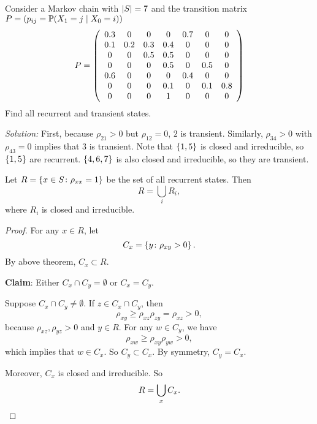 \begin{exam}
    Consider a Markov chain with $\left\lvert S\right\lvert = 7$ and the transition matrix $P= (p_{ij} = \mathbb{P}(X_1 = j \mid X_0 = i))$
    \begin{equation*}
        P = \left(
            \begin{array}{ccccccc}
                0.3 & 0 & 0 & 0 & 0.7 & 0 & 0 \\
                0.1 & 0.2 & 0.3 & 0.4 & 0 & 0 & 0 \\
                0 & 0 & 0.5 & 0.5 & 0 & 0 & 0  \\
                0 & 0 & 0 & 0.5 & 0 & 0.5 &0 \\
                0.6 & 0 & 0 & 0 &0.4 & 0 & 0 \\
                0 & 0 & 0 & 0.1 & 0 & 0.1 & 0.8 \\
                0 & 0 & 0 & 1 & 0 & 0 & 0
            \end{array}
        \right)
    \end{equation*}
   Find all recurrent and transient states.
   
   \noindent \emph{Solution:} First, because $\rho_{21} > 0$ but $\rho_{12} = 0$, $2$ is transient. Similarly, $\rho_{34} > 0$ with $\rho_{43} = 0$ implies that $3$ is transient. Note that $\left\{1,5\right\}$ is closed and irreducible, so $\left\{1,5\right\}$ are recurrent. $\left\{4,6,7\right\}$ is also closed and irreducible, so they are transient.
\end{exam}

\begin{thm}
    Let $R = \left\{x \in S \colon \rho_{xx} = 1\right\}$ be the set of all recurrent states. Then
    \begin{equation*}
        R = \bigcup_i R_i,
    \end{equation*}
    where $R_i$ is closed and irreducible.
\end{thm}
\begin{proof}
    For any $x \in R$, let
    \begin{equation*}
        C_x = \left\{y \colon \rho_{xy} > 0\right\}.
    \end{equation*}
    By above theorem, $C_x \subset R$.

    \noindent \textbf{Claim}: Either $C_x \cap C_y = \emptyset$ or $C_x = C_y$.

    \noindent Suppose $C_x \cap C_y \neq \emptyset$. If $z \in C_x \cap C_y$, then
    \begin{equation*}
        \rho_{xy} \geq \rho_{xz}\rho_{zy} = \rho_{xz} > 0,
    \end{equation*}
    because $\rho_{xz},\rho_{yz} > 0$ and $y \in R$. For any $w \in C_y$, we have
    \begin{equation*}
        \rho_{xw} \geq \rho_{xy}\rho_{yw} > 0,
    \end{equation*}
    which implies that $w \in C_x$. So $C_y \subset C_x$. By symmetry, $C_y = C_x$.

    \noindent Moreover, $C_x$ is closed and irreducible. So
    \begin{equation*}
        R = \bigcup_x C_x. \qedhere
    \end{equation*}
\end{proof}


